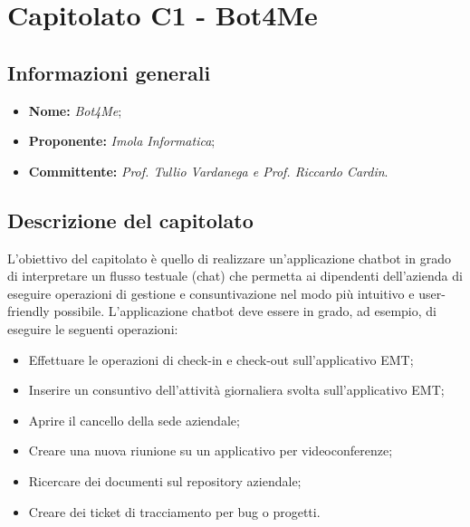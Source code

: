 \section{Capitolato C1 - Bot4Me}\label{section:c1}

\subsection{Informazioni generali}
	\begin {itemize}
		\item \textbf{Nome:} \textit{Bot4Me};
		\item \textbf{Proponente:} \textit{Imola Informatica};
		\item \textbf{Committente:} \textit{Prof. Tullio Vardanega e Prof. Riccardo Cardin}.
	\end{itemize}

	\subsection{Descrizione del capitolato}
		L’obiettivo del capitolato è quello di realizzare un'applicazione chatbot in grado di interpretare un flusso testuale (chat) che permetta ai dipendenti dell'azienda di eseguire operazioni di gestione e consuntivazione nel modo più intuitivo e user-friendly possibile.
		L'applicazione chatbot deve essere in grado, ad esempio, di eseguire le seguenti operazioni:
		\begin {itemize}
			\item Effettuare le operazioni di check-in e check-out sull’applicativo EMT;
			\item Inserire un consuntivo dell’attività giornaliera svolta sull’applicativo EMT;
			\item Aprire il cancello della sede aziendale;
			\item Creare una nuova riunione su un applicativo per videoconferenze;
			\item Ricercare dei documenti sul repository aziendale;
			\item Creare dei ticket di tracciamento per bug o progetti.
		\end{itemize}

